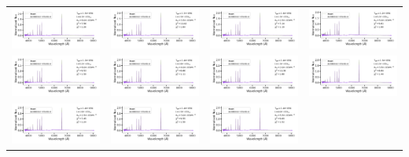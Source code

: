 \begin{table}
\begin{tabular}{l l l l }
    \includegraphics[width=0.24\linewidth, clip]{Figs/model_150000_37.22_3.78.pdf} & \includegraphics[width=0.24\linewidth, clip]{Figs/model_170000_36.86_3.54.pdf} & \includegraphics[width=0.24\linewidth, clip]{Figs/model_160000_36.70_3.40.pdf} & \includegraphics[width=0.24\linewidth, clip]{Figs/model_120000_37.30_3.70.pdf} \\
    \includegraphics[width=0.24\linewidth, clip]{Figs/model_130000_37.30_3.78.pdf} & \includegraphics[width=0.24\linewidth, clip]{Figs/model_140000_37.03_3.60.pdf} & \includegraphics[width=0.24\linewidth, clip]{Figs/model_140000_36.70_3.30.pdf} & \includegraphics[width=0.24\linewidth, clip]{Figs/model_150000_36.93_3.54.pdf} \\
    \includegraphics[width=0.24\linewidth, clip]{Figs/model_140000_36.79_3.40.pdf} & \includegraphics[width=0.24\linewidth, clip]{Figs/model_140000_36.86_3.48.pdf} & \includegraphics[width=0.24\linewidth, clip]{Figs/model_140000_37.19_3.74.pdf} \\

\end{tabular}
\end{table}
